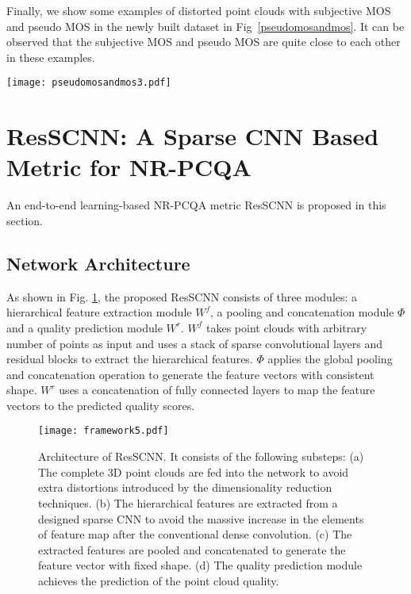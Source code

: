 \documentclass[acmsmall]{acmart}
\begin{document}
\par Finally, we show some examples of distorted point clouds with subjective MOS and pseudo MOS in the newly built dataset in Fig~\ref{pseudomosandmos}. It can be observed that the subjective MOS and pseudo MOS are quite close to each other in these examples.

\begin{figure*}[htbp]
	\centering
	\texttt{[image: pseudomosandmos3.pdf]}
	\caption{Selected point clouds with their subjective MOS and pseudo MOS. The associated subjective MOS and pseudo MOS are consistent.}
	\label{pseudomosandmos}

\end{figure*}


\section{ResSCNN: A Sparse CNN Based Metric for NR-PCQA}\label{sec:framework}

\par An end-to-end learning-based NR-PCQA metric ResSCNN is proposed in this section.

\subsection{Network Architecture}

\par As shown in Fig. \ref{framework}, the proposed ResSCNN consists of three modules: a hierarchical feature extraction module $W^{f}$, a pooling and concatenation module $\Phi$ and a quality prediction module $W^{r}$.
$W^{f}$ takes point clouds with arbitrary number of points as input and uses a stack of sparse convolutional layers and residual blocks to extract the hierarchical features. $\Phi$ applies the global pooling and concatenation operation to generate the feature vectors with consistent shape. $W^{r}$ uses a concatenation of fully connected layers to map the feature vectors to the predicted quality scores.

\begin{figure}[htbp]
	\centering
	\texttt{[image: framework5.pdf]}
	\caption{Architecture of ResSCNN. It consists of the following substeps: (a) The complete 3D point clouds are fed into the network to avoid extra distortions introduced by the dimensionality reduction techniques. (b) The hierarchical features are extracted from a designed sparse CNN to avoid the massive increase in the elements of feature map after the conventional dense convolution. (c) The extracted features are pooled and concatenated to generate the feature vector with fixed shape. (d) The quality prediction module achieves the prediction of the point cloud quality.}
	\label{framework}

\end{figure}
\end{document}
